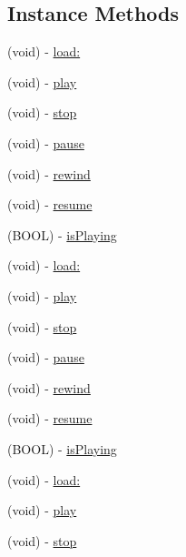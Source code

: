 \subsection*{Instance Methods}
\begin{DoxyCompactItemize}
\item 
(void) -\/ \hyperlink{interfaceCDLongAudioSource_a50cff2f77f96cf9a2655d5e18af9f225}{load\+:}
\item 
(void) -\/ \hyperlink{interfaceCDLongAudioSource_a2e2e9ba6cb50860a4ef8e310dc8eab65}{play}
\item 
(void) -\/ \hyperlink{interfaceCDLongAudioSource_ae77879d7c0e770cf58f8b8fb27cc29d4}{stop}
\item 
(void) -\/ \hyperlink{interfaceCDLongAudioSource_a66db0e34e875823c4c0ea87b2036369c}{pause}
\item 
(void) -\/ \hyperlink{interfaceCDLongAudioSource_a2641a580b551bbd9e3ae8473af697284}{rewind}
\item 
(void) -\/ \hyperlink{interfaceCDLongAudioSource_a0cbc59ea523580c5e5338063b7a0df5f}{resume}
\item 
(B\+O\+OL) -\/ \hyperlink{interfaceCDLongAudioSource_a555f3c24d76f6e4d23bd809c2d064994}{is\+Playing}
\item 
(void) -\/ \hyperlink{interfaceCDLongAudioSource_a50cff2f77f96cf9a2655d5e18af9f225}{load\+:}
\item 
(void) -\/ \hyperlink{interfaceCDLongAudioSource_a2e2e9ba6cb50860a4ef8e310dc8eab65}{play}
\item 
(void) -\/ \hyperlink{interfaceCDLongAudioSource_ae77879d7c0e770cf58f8b8fb27cc29d4}{stop}
\item 
(void) -\/ \hyperlink{interfaceCDLongAudioSource_a66db0e34e875823c4c0ea87b2036369c}{pause}
\item 
(void) -\/ \hyperlink{interfaceCDLongAudioSource_a2641a580b551bbd9e3ae8473af697284}{rewind}
\item 
(void) -\/ \hyperlink{interfaceCDLongAudioSource_a0cbc59ea523580c5e5338063b7a0df5f}{resume}
\item 
(B\+O\+OL) -\/ \hyperlink{interfaceCDLongAudioSource_a555f3c24d76f6e4d23bd809c2d064994}{is\+Playing}
\item 
(void) -\/ \hyperlink{interfaceCDLongAudioSource_a50cff2f77f96cf9a2655d5e18af9f225}{load\+:}
\item 
(void) -\/ \hyperlink{interfaceCDLongAudioSource_a2e2e9ba6cb50860a4ef8e310dc8eab65}{play}
\item 
(void) -\/ \hyperlink{interfaceCDLongAudioSource_ae77879d7c0e770cf58f8b8fb27cc29d4}{stop}

\end{DoxyCompactItemize}
